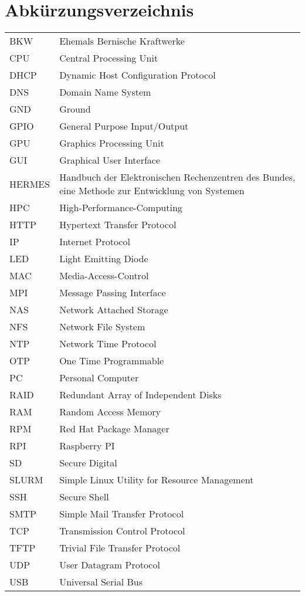 \section*{Abkürzungsverzeichnis}

\begin{table}[H]
\centering
\label{my-label}
\begin{tabular}{p{2cm}p{14cm}}
BKW & Ehemals Bernische Kraftwerke \\
CPU & Central Processing Unit \\
DHCP & Dynamic Host Configuration Protocol \\
DNS & Domain Name System \\
GND & Ground \\
GPIO & General Purpose Input/Output \\
GPU & Graphics Processing Unit \\
GUI & Graphical User Interface \\
HERMES & Handbuch der Elektronischen Rechenzentren des Bundes, eine Methode zur Entwicklung von Systemen \\
HPC & High-Performance-Computing \\
HTTP & Hypertext Transfer Protocol \\
IP & Internet Protocol \\
LED & Light Emitting Diode \\
MAC & Media-Access-Control \\
MPI & Message Passing Interface \\
NAS & Network Attached Storage  \\
NFS & Network File System \\
NTP & Network Time Protocol \\
OTP & One Time Programmable \\
PC & Personal Computer \\
RAID & Redundant Array of Independent Disks \\
RAM & Random Access Memory \\
RPM & Red Hat Package Manager \\
RPI & Raspberry PI \\
SD & Secure Digital \\
SLURM & Simple Linux Utility for Resource Management \\
SSH & Secure Shell  \\
SMTP & Simple Mail Transfer Protocol \\
TCP & Transmission Control Protocol \\
TFTP & Trivial File Transfer Protocol \\
UDP & User Datagram Protocol \\
USB & Universal Serial Bus \\
\end{tabular}
\end{table}
